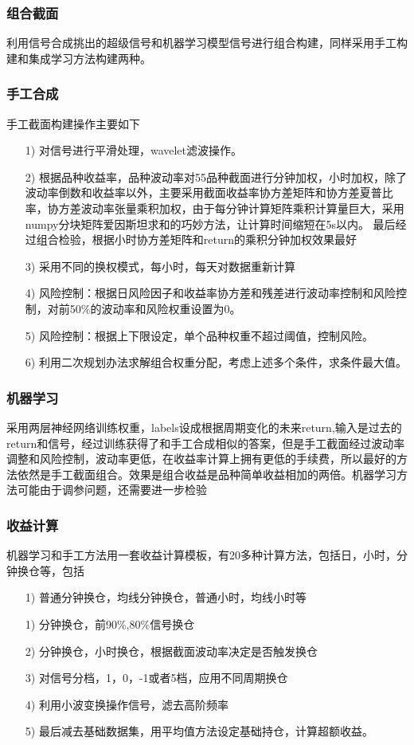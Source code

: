 \documentclass[11pt]{ctexart}
\begin{document}
\subsubsection{组合截面}
利用信号合成挑出的超级信号和机器学习模型信号进行组合构建，同样采用手工构建和集成学习方法构建两种。
\subsubsection{手工合成}
手工截面构建操作主要如下
\begin{itemize}
  \item [1)]
  对信号进行平滑处理，wavelet滤波操作。
  \item [2)]
  根据品种收益率，品种波动率对55品种截面进行分钟加权，小时加权，除了波动率倒数和收益率以外，主要采用截面收益率协方差矩阵和协方差夏普比率，协方差波动率张量乘积加权，由于每分钟计算矩阵乘积计算量巨大，采用numpy分块矩阵爱因斯坦求和的巧妙方法，让计算时间缩短在5s以内。
  最后经过组合检验，根据小时协方差矩阵和return的乘积分钟加权效果最好
  \item [3)]
  采用不同的换权模式，每小时，每天对数据重新计算
  \item [4)]
  风险控制：根据日风险因子和收益率协方差和残差进行波动率控制和风险控制，对前50\%的波动率和风险权重设置为0。
  \item [5)]
  风险控制：根据上下限设定，单个品种权重不超过阈值，控制风险。
  \item [6)]
  利用二次规划办法求解组合权重分配，考虑上述多个条件，求条件最大值。

\end{itemize}

\subsubsection{机器学习}
采用两层神经网络训练权重，labels设成根据周期变化的未来return,输入是过去的return和信号，经过训练获得了和手工合成相似的答案，但是手工截面经过波动率调整和风险控制，波动率更低，在收益率计算上拥有更低的手续费，所以最好的方法依然是手工截面组合。效果是组合收益是品种简单收益相加的两倍。机器学习方法可能由于调参问题，还需要进一步检验

\subsubsection{收益计算}
机器学习和手工方法用一套收益计算模板，有20多种计算方法，包括日，小时，分钟换仓等，包括
\begin{itemize}
  \item [1)]
  普通分钟换仓，均线分钟换仓，普通小时，均线小时等
  \item [1)]
  分钟换仓，前90\%,80\%信号换仓
  \item [2)]
  分钟换仓，小时换仓，根据截面波动率决定是否触发换仓
  \item [3)]
  对信号分档，1，0，-1或者5档，应用不同周期换仓
  \item [4)]
  利用小波变换操作信号，滤去高阶频率
  \item [5)]
  最后减去基础数据集，用平均值方法设定基础持仓，计算超额收益。

\end{itemize}
\end{document}
